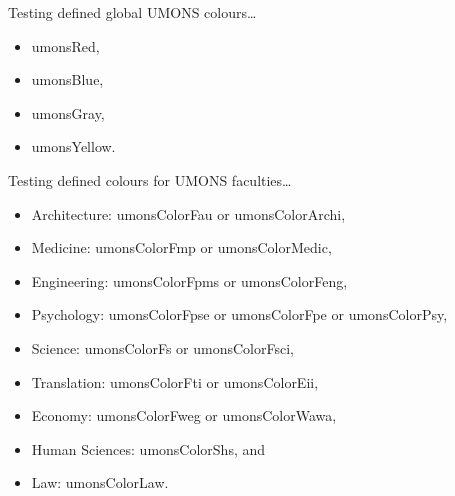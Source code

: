 \documentclass{minimal}
\begin{document}
	Testing defined global UMONS colours\ldots
	\begin{itemize}
		\item \textcolor{umonsRed}{umonsRed},
		\item \textcolor{umonsBlue}{umonsBlue},
		\item \textcolor{umonsGray}{umonsGray},
		\item \textcolor{umonsYellow}{umonsYellow}.
	\end{itemize}
	
	Testing defined colours for UMONS faculties\ldots
	\begin{itemize}
		\item Architecture: \textcolor{umonsColorFau}{umonsColorFau} or \textcolor{umonsColorArchi}{umonsColorArchi},
		\item Medicine: \textcolor{umonsColorFmp}{umonsColorFmp} or \textcolor{umonsColorMedic}{umonsColorMedic},
		\item Engineering: \textcolor{umonsColorFpms}{umonsColorFpms} or \textcolor{umonsColorFeng}{umonsColorFeng},
		\item Psychology: \textcolor{umonsColorFpse}{umonsColorFpse} or \textcolor{umonsColorFpe}{umonsColorFpe} or \textcolor{umonsColorPsy}{umonsColorPsy},
		\item Science: \textcolor{umonsColorFs}{umonsColorFs} or \textcolor{umonsColorFsci}{umonsColorFsci},
		\item Translation: \textcolor{umonsColorFti}{umonsColorFti} or \textcolor{umonsColorEii}{umonsColorEii},
		\item Economy: \textcolor{umonsColorFweg}{umonsColorFweg} or \textcolor{umonsColorWawa}{umonsColorWawa},
		\item Human Sciences: \textcolor{umonsColorShs}{umonsColorShs}, and
		\item Law: \textcolor{umonsColorLaw}{umonsColorLaw}.
	\end{itemize}
\end{document}
